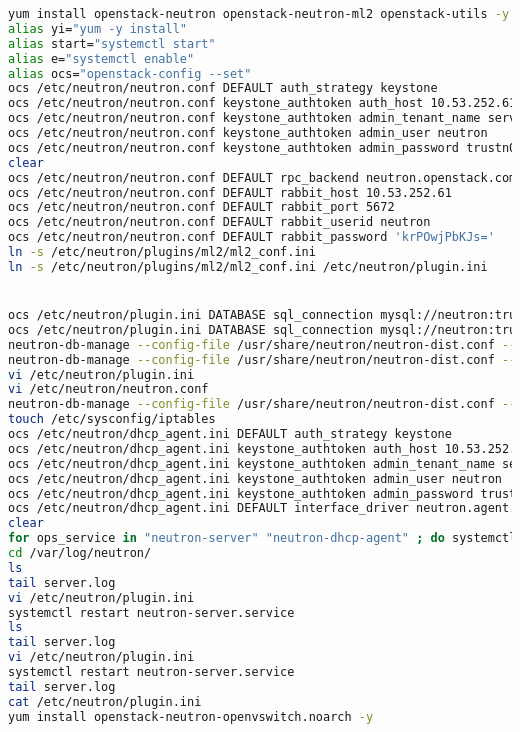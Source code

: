 \documentclass[11pt,letterpaper,oneside]{book}
\begin{document}
\begin{lstlisting}[caption={Neutron virneupaw001},language=bash]
yum install openstack-neutron openstack-neutron-ml2 openstack-utils -y
alias yi="yum -y install"
alias start="systemctl start"
alias e="systemctl enable"
alias ocs="openstack-config --set"
ocs /etc/neutron/neutron.conf DEFAULT auth_strategy keystone
ocs /etc/neutron/neutron.conf keystone_authtoken auth_host 10.53.252.61
ocs /etc/neutron/neutron.conf keystone_authtoken admin_tenant_name service
ocs /etc/neutron/neutron.conf keystone_authtoken admin_user neutron
ocs /etc/neutron/neutron.conf keystone_authtoken admin_password trustn01
clear
ocs /etc/neutron/neutron.conf DEFAULT rpc_backend neutron.openstack.common.rpc.impl_kombu
ocs /etc/neutron/neutron.conf DEFAULT rabbit_host 10.53.252.61
ocs /etc/neutron/neutron.conf DEFAULT rabbit_port 5672
ocs /etc/neutron/neutron.conf DEFAULT rabbit_userid neutron
ocs /etc/neutron/neutron.conf DEFAULT rabbit_password 'krPOwjPbKJs='
ln -s /etc/neutron/plugins/ml2/ml2_conf.ini
ln -s /etc/neutron/plugins/ml2/ml2_conf.ini /etc/neutron/plugin.ini


ocs /etc/neutron/plugin.ini DATABASE sql_connection mysql://neutron:trustn01@10.53.252.61/neutron
ocs /etc/neutron/plugin.ini DATABASE sql_connection mysql://neutron:trustn01@10.53.252.61/neutron_ml2
neutron-db-manage --config-file /usr/share/neutron/neutron-dist.conf --config-file /etc/neutron/neutron.conf --config /etc/neutron/plugin.ini upgrade head
neutron-db-manage --config-file /usr/share/neutron/neutron-dist.conf --config-file /etc/neutron/neutron.conf --config-file /etc/neutron/plugin.ini upgrade head
vi /etc/neutron/plugin.ini 
vi /etc/neutron/neutron.conf 
neutron-db-manage --config-file /usr/share/neutron/neutron-dist.conf --config-file /etc/neutron/neutron.conf --config-file /etc/neutron/plugin.ini upgrade head
touch /etc/sysconfig/iptables
ocs /etc/neutron/dhcp_agent.ini DEFAULT auth_strategy keystone
ocs /etc/neutron/dhcp_agent.ini keystone_authtoken auth_host 10.53.252.61
ocs /etc/neutron/dhcp_agent.ini keystone_authtoken admin_tenant_name service
ocs /etc/neutron/dhcp_agent.ini keystone_authtoken admin_user neutron
ocs /etc/neutron/dhcp_agent.ini keystone_authtoken admin_password trustn01
ocs /etc/neutron/dhcp_agent.ini DEFAULT interface_driver neutron.agent.linux.interface.OVSInterfaceDriver
clear
for ops_service in "neutron-server" "neutron-dhcp-agent" ; do systemctl enable $ops_service; systemctl start $ops_service; done
cd /var/log/neutron/
ls
tail server.log 
vi /etc/neutron/plugin.ini 
systemctl restart neutron-server.service 
ls
tail server.log 
vi /etc/neutron/plugin.ini 
systemctl restart neutron-server.service 
tail server.log 
cat /etc/neutron/plugin.ini 
yum install openstack-neutron-openvswitch.noarch -y


\end{lstlisting}
\end{document}
